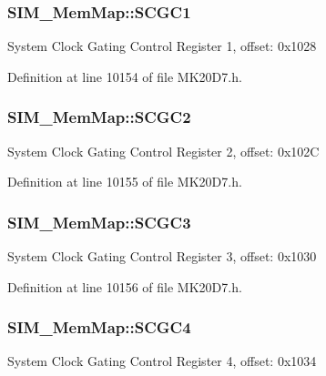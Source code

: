 \subsubsection[{\texorpdfstring{S\+C\+G\+C1}{SCGC1}}]{ S\+I\+M\+\_\+\+Mem\+Map\+::\+S\+C\+G\+C1}\hypertarget{struct_s_i_m___mem_map_a60b8b2dca489117a38ffb151a9811a16}{}\label{struct_s_i_m___mem_map_a60b8b2dca489117a38ffb151a9811a16}
System Clock Gating Control Register 1, offset\+: 0x1028 

Definition at line 10154 of file M\+K20\+D7.\+h.

\subsubsection[{\texorpdfstring{S\+C\+G\+C2}{SCGC2}}]{ S\+I\+M\+\_\+\+Mem\+Map\+::\+S\+C\+G\+C2}\hypertarget{struct_s_i_m___mem_map_a24daa19260e48fdf48c35cf7ed920d3a}{}\label{struct_s_i_m___mem_map_a24daa19260e48fdf48c35cf7ed920d3a}
System Clock Gating Control Register 2, offset\+: 0x102C 

Definition at line 10155 of file M\+K20\+D7.\+h.

\subsubsection[{\texorpdfstring{S\+C\+G\+C3}{SCGC3}}]{ S\+I\+M\+\_\+\+Mem\+Map\+::\+S\+C\+G\+C3}\hypertarget{struct_s_i_m___mem_map_a5001a137aa37a5970e622219a5703956}{}\label{struct_s_i_m___mem_map_a5001a137aa37a5970e622219a5703956}
System Clock Gating Control Register 3, offset\+: 0x1030 

Definition at line 10156 of file M\+K20\+D7.\+h.

\subsubsection[{\texorpdfstring{S\+C\+G\+C4}{SCGC4}}]{ S\+I\+M\+\_\+\+Mem\+Map\+::\+S\+C\+G\+C4}\hypertarget{struct_s_i_m___mem_map_a96c123ab70356a131990c9ae3812834e}{}\label{struct_s_i_m___mem_map_a96c123ab70356a131990c9ae3812834e}
System Clock Gating Control Register 4, offset\+: 0x1034 

